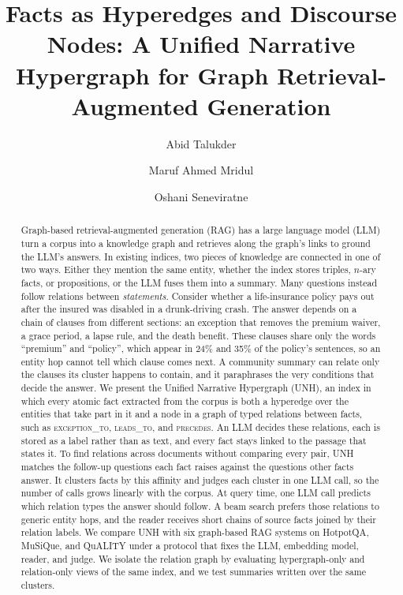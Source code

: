 \documentclass[sigconf, review, anonymous]{acmart}
\newcommand{\sys}{UNH}
\newcommand{\sysfull}{Unified Narrative Hypergraph}
\newcommand{\rel}[1]{\textsc{#1}}            %
\begin{document}
\title{Facts as Hyperedges and Discourse Nodes: A Unified Narrative Hypergraph for Graph Retrieval-Augmented Generation}

\author{Abid Talukder}

\author{Maruf Ahmed Mridul}

\author{Oshani Seneviratne}

\renewcommand{\shortauthors}{Talukder et al.}

\begin{abstract}
Graph-based retrieval-augmented generation (RAG) has a large language model (LLM) turn a corpus into a knowledge graph and retrieves along the graph's links to ground the LLM's answers. In existing indices, two pieces of knowledge are connected in one of two ways. Either they mention the same entity, whether the index stores triples, $n$-ary facts, or propositions, or the LLM fuses them into a summary. Many questions instead follow relations between \emph{statements}. Consider whether a life-insurance policy pays out after the insured was disabled in a drunk-driving crash. The answer depends on a chain of clauses from different sections: an exception that removes the premium waiver, a grace period, a lapse rule, and the death benefit. These clauses share only the words ``premium'' and ``policy'', which appear in 24\% and 35\% of the policy's sentences, so an entity hop cannot tell which clause comes next. A community summary can relate only the clauses its cluster happens to contain, and it paraphrases the very conditions that decide the answer. We present the \sysfull{} (\sys{}), an index in which every atomic fact extracted from the corpus is both a hyperedge over the entities that take part in it and a node in a graph of typed relations between facts, such as \rel{exception\_to}, \rel{leads\_to}, and \rel{precedes}. An LLM decides these relations, each is stored as a label rather than as text, and every fact stays linked to the passage that states it. To find relations across documents without comparing every pair, \sys{} matches the follow-up questions each fact raises against the questions other facts answer. It clusters facts by this affinity and judges each cluster in one LLM call, so the number of calls grows linearly with the corpus. At query time, one LLM call predicts which relation types the answer should follow. A beam search prefers those relations to generic entity hops, and the reader receives short chains of source facts joined by their relation labels. We compare \sys{} with six graph-based RAG systems on HotpotQA, MuSiQue, and QuALITY under a protocol that fixes the LLM, embedding model, reader, and judge. We isolate the relation graph by evaluating hypergraph-only and relation-only views of the same index, and we test summaries written over the same clusters.

\end{abstract}
\end{document}
